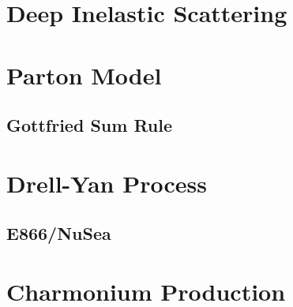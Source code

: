 \section {Deep Inelastic Scattering}

\section{Parton Model}

\subsection{Gottfried Sum Rule}

\section{Drell-Yan Process}

\subsection{E866/NuSea}

\section{Charmonium Production}


